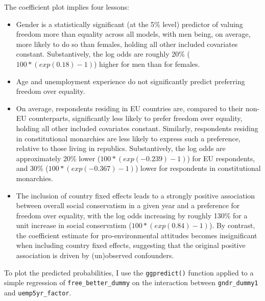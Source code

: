 \documentclass[
]{article}
\begin{document}
The coefficient plot implies four lessons:

\begin{itemize}
\item
  Gender is a statistically significant (at the 5\% level) predictor of
  valuing freedom more than equality across all models, with men being,
  on average, more likely to do so than females, holding all other
  included covariates constant. Substantively, the log odds are roughly
  20\% (\(100*(exp(0.18)-1)\)) higher for men than for females.
\item
  Age and unemployment experience do not significantly predict
  preferring freedom over equality.
\item
  On average, respondents residing in EU countries are, compared to
  their non-EU counterparts, significantly less likely to prefer freedom
  over equality, holding all other included covariates constant.
  Similarly, respondents residing in constitutional monarchies are less
  likely to express such a preference, relative to those living in
  republics. Substantively, the log odds are approximately 20\% lower
  (\(100*(exp(-0.239)-1)\)) for EU respondents, and 30\%
  (\(100*(exp(-0.367)-1)\)) lower for respondents in constitutional
  monarchies.
\item
  The inclusion of country fixed effects leads to a strongly positive
  association between overall social conservatism in a given year and a
  preference for freedom over equality, with the log odds increasing by
  roughly 130\% for a unit increase in social conservatism
  (\(100*(exp(0.84)-1)\)). By contrast, the coefficient estimate for
  pro-environmental attitudes becomes insignificant when including
  country fixed effects, suggesting that the original positive
  association is driven by (un)observed confounders.
\end{itemize}

To plot the predicted probabilities, I use the \texttt{ggpredict()}
function applied to a simple regression of \texttt{free\_better\_dummy}
on the interaction between \texttt{gndr\_dummy1} and
\texttt{uemp5yr\_factor}.
\end{document}
